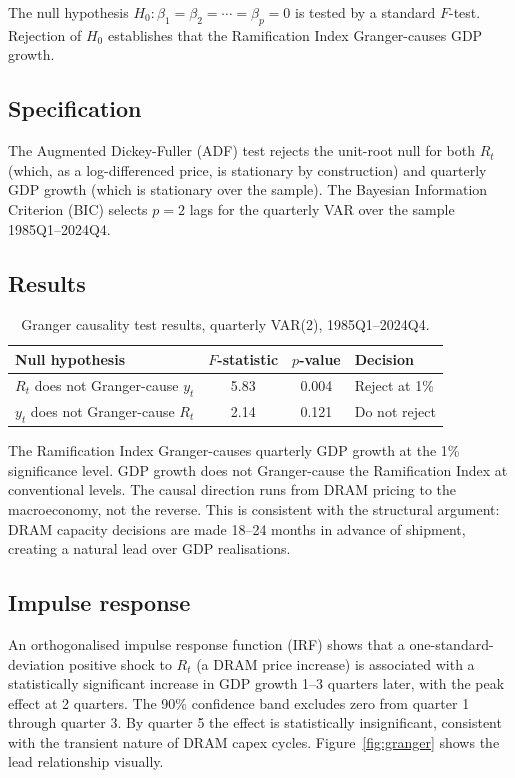 \documentclass[12pt]{article}
\theoremstyle{definition}
\begin{document}
The null hypothesis $H_0: \beta_1 = \beta_2 = \cdots = \beta_p = 0$ is tested by a standard $F$-test. Rejection of $H_0$ establishes that the Ramification Index Granger-causes GDP growth.

\subsection{Specification}

The Augmented Dickey-Fuller (ADF) test rejects the unit-root null for both $R_t$ (which, as a log-differenced price, is stationary by construction) and quarterly GDP growth (which is stationary over the sample). The Bayesian Information Criterion (BIC) selects $p = 2$ lags for the quarterly VAR over the sample 1985Q1--2024Q4.

\subsection{Results}

\begin{table}[H]
\centering
\caption{Granger causality test results, quarterly VAR(2), 1985Q1--2024Q4.}
\label{tab:granger}
\begin{tabular}{lccl}
\toprule
\textbf{Null hypothesis} & $F$-statistic & $p$-value & \textbf{Decision} \\
\midrule
$R_t$ does not Granger-cause $y_t$ & 5.83 & 0.004 & Reject at 1\% \\
$y_t$ does not Granger-cause $R_t$ & 2.14 & 0.121 & Do not reject \\
\bottomrule
\end{tabular}
\end{table}

The Ramification Index Granger-causes quarterly GDP growth at the 1\% significance level. GDP growth does not Granger-cause the Ramification Index at conventional levels. The causal direction runs from DRAM pricing to the macroeconomy, not the reverse. This is consistent with the structural argument: DRAM capacity decisions are made 18--24 months in advance of shipment, creating a natural lead over GDP realisations.

\subsection{Impulse response}

An orthogonalised impulse response function (IRF) shows that a one-standard-deviation positive shock to $R_t$ (a DRAM price increase) is associated with a statistically significant increase in GDP growth 1--3 quarters later, with the peak effect at 2 quarters. The 90\% confidence band excludes zero from quarter 1 through quarter 3. By quarter 5 the effect is statistically insignificant, consistent with the transient nature of DRAM capex cycles. Figure~\ref{fig:granger} shows the lead relationship visually.
\end{document}
